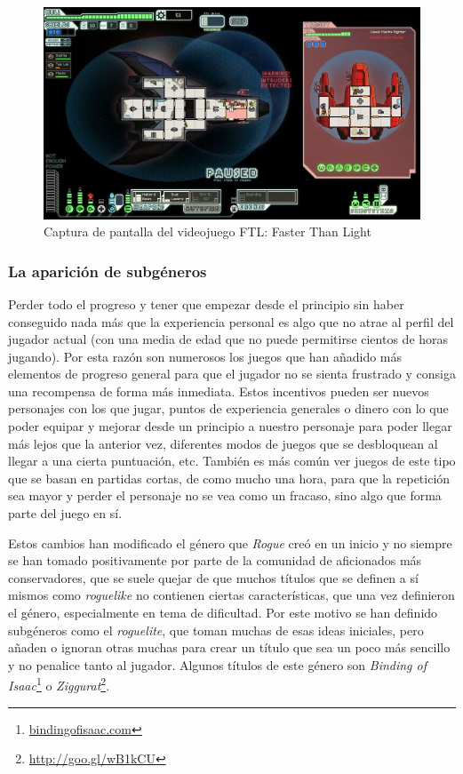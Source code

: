 \begin{figure}[h!]
		\includegraphics[width=\textwidth,height=\textheight,keepaspectratio]{./img/ftl.jpg}
	\caption{Captura de pantalla del videojuego FTL: Faster Than Light}
	\label{fig:ftl}
\end{figure}

\subsubsection{La aparición de subgéneros}

Perder todo el progreso y tener que empezar desde el principio sin haber conseguido nada más que la experiencia personal es algo que no atrae al perfil del jugador actual (con una media de edad que no puede permitirse cientos de horas jugando). Por esta razón son numerosos los juegos que han añadido más elementos de progreso general para que el jugador no se sienta frustrado y consiga una recompensa de forma más inmediata. Estos incentivos pueden ser nuevos personajes con los que jugar, puntos de experiencia generales o dinero con lo que poder equipar y mejorar desde un principio a nuestro personaje para poder llegar más lejos que la anterior vez, diferentes modos de juegos que se desbloquean al llegar a una cierta puntuación, etc.
También es más común ver juegos de este tipo que se basan en partidas cortas, de como mucho una hora, para que la repetición sea mayor y perder el personaje no se vea como un fracaso, sino algo que forma parte del juego en sí.

Estos cambios han modificado el género que \textit{Rogue} creó en un inicio y no siempre se han tomado positivamente por parte de la comunidad de aficionados más conservadores, que se suele quejar de que muchos títulos que se definen a sí mismos como \textit{roguelike} no contienen ciertas características, que una vez definieron el género, especialmente en tema de dificultad. Por este motivo se han definido subgéneros como el \textit{roguelite}, que toman muchas de esas ideas iniciales, pero añaden o ignoran otras muchas para crear un título que sea un poco más sencillo y no penalice tanto al jugador. Algunos títulos de este género son \textit{Binding of Isaac}\footnote{\url{bindingofisaac.com}} o \textit{Ziggurat}\footnote{\url{http://goo.gl/wB1kCU}}.

